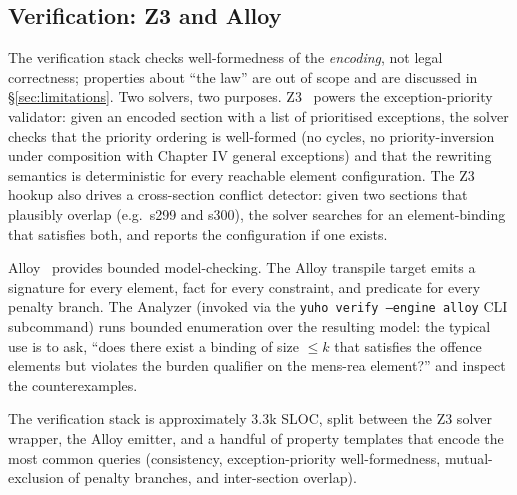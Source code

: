 \subsection{Verification: Z3 and Alloy}
\label{subsec:verify}
The verification stack checks well-formedness of the \emph{encoding}, not
legal correctness; properties about ``the law'' are out of scope and are
discussed in \S\ref{sec:limitations}. Two solvers, two purposes.
Z3~\cite{demoura2008z3} powers the
exception-priority validator: given an encoded section with a list of
prioritised exceptions, the solver checks that the priority ordering is
well-formed (no cycles, no priority-inversion under composition with
Chapter IV general exceptions) and that the rewriting semantics is
deterministic for every reachable element configuration. The Z3 hookup
also drives a cross-section conflict detector: given two sections that
plausibly overlap (e.g.\ s299 and s300), the solver searches for an
element-binding that satisfies both, and reports the configuration if
one exists.

Alloy~\cite{jackson2002alloy} provides bounded model-checking. The Alloy
transpile target emits a signature for every element, fact for every
constraint, and predicate for every penalty branch. The Analyzer
(invoked via the \texttt{yuho verify --engine alloy} CLI subcommand)
runs bounded enumeration over the resulting model: the typical use is
to ask, ``does there exist a binding of size $\leq k$ that satisfies
the offence elements but violates the burden qualifier on the mens-rea
element?'' and inspect the counterexamples.

The verification stack is approximately 3.3k SLOC, split between the
Z3 solver wrapper, the Alloy emitter, and a handful of property
templates that encode the most common queries (consistency,
exception-priority well-formedness, mutual-exclusion of penalty
branches, and inter-section overlap).

